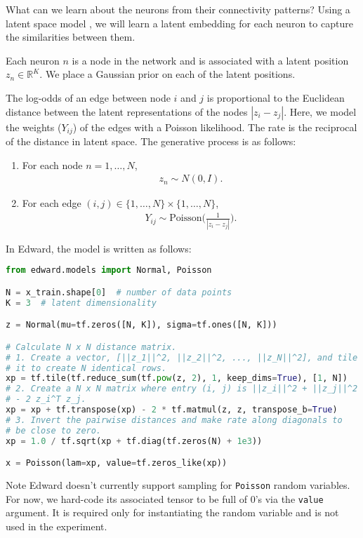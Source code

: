 What can we learn about the neurons from their connectivity patterns? Using
a latent space model \citep{hoff2002latent}, we will learn a latent
embedding for each neuron to capture the similarities between them.

Each neuron $n$ is a node in the network and is associated with a latent
position $z_n\in\mathbb{R}^K$.
We place a Gaussian prior on each of the latent positions.

The log-odds of an edge between node $i$ and
$j$ is proportional to the Euclidean distance between the latent
representations of the nodes $|z_i- z_j|$. Here, we
model the weights ($Y_{ij}$) of the edges with a Poisson likelihood.
The rate is the reciprocal of the distance in latent space. The
generative process is as follows:

\begin{enumerate}
\item
For each node $n=1,\ldots,N$,
\begin{align}
z_n \sim N(0,I).
\end{align}
\item
For each edge $(i,j)\in\{1,\ldots,N\}\times\{1,\ldots,N\}$,
\begin{align}
Y_{ij} \sim \text{Poisson}\Bigg(\frac{1}{|z_i - z_j|}\Bigg).
\end{align}
\end{enumerate}

In Edward, the model is written as follows:
\begin{lstlisting}[language=Python]
from edward.models import Normal, Poisson

N = x_train.shape[0]  # number of data points
K = 3  # latent dimensionality

z = Normal(mu=tf.zeros([N, K]), sigma=tf.ones([N, K]))

# Calculate N x N distance matrix.
# 1. Create a vector, [||z_1||^2, ||z_2||^2, ..., ||z_N||^2], and tile
# it to create N identical rows.
xp = tf.tile(tf.reduce_sum(tf.pow(z, 2), 1, keep_dims=True), [1, N])
# 2. Create a N x N matrix where entry (i, j) is ||z_i||^2 + ||z_j||^2
# - 2 z_i^T z_j.
xp = xp + tf.transpose(xp) - 2 * tf.matmul(z, z, transpose_b=True)
# 3. Invert the pairwise distances and make rate along diagonals to
# be close to zero.
xp = 1.0 / tf.sqrt(xp + tf.diag(tf.zeros(N) + 1e3))

x = Poisson(lam=xp, value=tf.zeros_like(xp))
\end{lstlisting}

Note Edward doesn't currently support sampling for \texttt{Poisson}
random variables. For now, we hard-code its associated tensor to be
full of 0's via the \texttt{value} argument. It is required only for
instantiating the random variable and is not used in the experiment.

